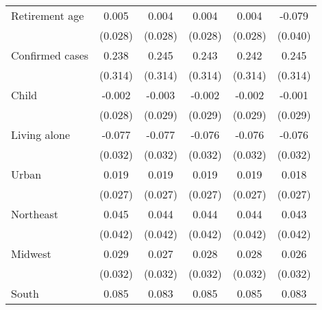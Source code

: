 {\begin{tabular}{l*{5}{c}}
\addlinespace
Retirement age      &       0.005         &       0.004         &       0.004         &       0.004         &      -0.079\sym{**} \\
                    &     (0.028)         &     (0.028)         &     (0.028)         &     (0.028)         &     (0.040)         \\
\addlinespace
Confirmed cases     &       0.238         &       0.245         &       0.243         &       0.242         &       0.245         \\
                    &     (0.314)         &     (0.314)         &     (0.314)         &     (0.314)         &     (0.314)         \\
\addlinespace
Child               &      -0.002         &      -0.003         &      -0.002         &      -0.002         &      -0.001         \\
                    &     (0.028)         &     (0.029)         &     (0.029)         &     (0.029)         &     (0.029)         \\
\addlinespace
Living alone        &      -0.077\sym{**} &      -0.077\sym{**} &      -0.076\sym{**} &      -0.076\sym{**} &      -0.076\sym{**} \\
                    &     (0.032)         &     (0.032)         &     (0.032)         &     (0.032)         &     (0.032)         \\
\addlinespace
Urban               &       0.019         &       0.019         &       0.019         &       0.019         &       0.018         \\
                    &     (0.027)         &     (0.027)         &     (0.027)         &     (0.027)         &     (0.027)         \\
\addlinespace
Northeast           &       0.045         &       0.044         &       0.044         &       0.044         &       0.043         \\
                    &     (0.042)         &     (0.042)         &     (0.042)         &     (0.042)         &     (0.042)         \\
\addlinespace
Midwest             &       0.029         &       0.027         &       0.028         &       0.028         &       0.026         \\
                    &     (0.032)         &     (0.032)         &     (0.032)         &     (0.032)         &     (0.032)         \\
\addlinespace
South               &       0.085\sym{***}&       0.083\sym{***}&       0.085\sym{***}&       0.085\sym{***}&       0.083\sym{***}\\

\end{tabular}}

